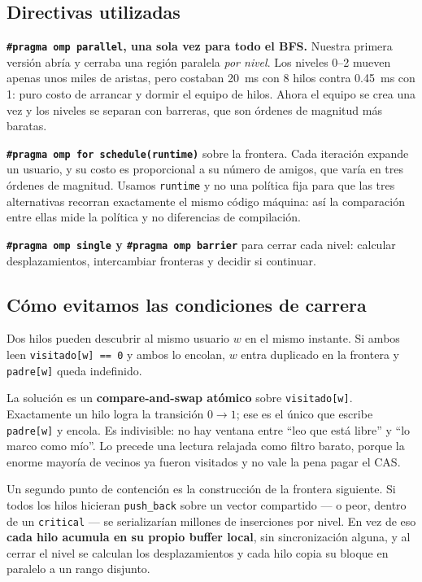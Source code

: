 \documentclass[11pt,a4paper]{article}
\begin{document}
\subsection*{Directivas utilizadas}

\textbf{\texttt{\#pragma omp parallel}, una sola vez para todo el BFS.}
Nuestra primera versión abría y cerraba una región paralela \emph{por nivel}.
Los niveles 0--2 mueven apenas unos miles de aristas, pero costaban 20~ms con 8
hilos contra 0.45~ms con 1: puro costo de arrancar y dormir el equipo de hilos.
Ahora el equipo se crea una vez y los niveles se separan con barreras, que son
órdenes de magnitud más baratas.

\textbf{\texttt{\#pragma omp for schedule(runtime)}} sobre la frontera. Cada
iteración expande un usuario, y su costo es proporcional a su número de amigos,
que varía en tres órdenes de magnitud. Usamos \texttt{runtime} y no una
política fija para que las tres alternativas recorran exactamente el mismo
código máquina: así la comparación entre ellas mide la política y no
diferencias de compilación.

\textbf{\texttt{\#pragma omp single} y \texttt{\#pragma omp barrier}} para
cerrar cada nivel: calcular desplazamientos, intercambiar fronteras y decidir
si continuar.

\subsection*{Cómo evitamos las condiciones de carrera}

Dos hilos pueden descubrir al mismo usuario $w$ en el mismo instante. Si ambos
leen \texttt{visitado[w] == 0} y ambos lo encolan, $w$ entra duplicado en la
frontera y \texttt{padre[w]} queda indefinido.

La solución es un \textbf{compare-and-swap atómico} sobre
\texttt{visitado[w]}. Exactamente un hilo logra la transición $0 \to 1$; ese es
el único que escribe \texttt{padre[w]} y encola. Es indivisible: no hay ventana
entre ``leo que está libre'' y ``lo marco como mío''. Lo precede una lectura
relajada como filtro barato, porque la enorme mayoría de vecinos ya fueron
visitados y no vale la pena pagar el CAS.

Un segundo punto de contención es la construcción de la frontera siguiente. Si
todos los hilos hicieran \texttt{push\_back} sobre un vector compartido --- o
peor, dentro de un \texttt{critical} --- se serializarían millones de
inserciones por nivel. En vez de eso \textbf{cada hilo acumula en su propio
buffer local}, sin sincronización alguna, y al cerrar el nivel se calculan los
desplazamientos y cada hilo copia su bloque en paralelo a un rango disjunto.
\end{document}
